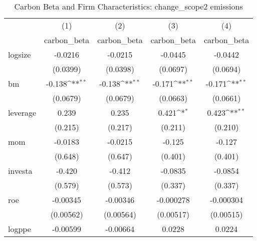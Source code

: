 \begin{table}[htbp]\centering
\def\sym#1{\ifmmode^{#1}\else\(^{#1}\)\fi}
\caption{Carbon Beta and Firm Characteristics: change\_scope2 emissions}
\begin{tabular}{l*{4}{c}}
\hline\hline
                    &\multicolumn{1}{c}{(1)}&\multicolumn{1}{c}{(2)}&\multicolumn{1}{c}{(3)}&\multicolumn{1}{c}{(4)}\\
                    &\multicolumn{1}{c}{carbon\_beta}&\multicolumn{1}{c}{carbon\_beta}&\multicolumn{1}{c}{carbon\_beta}&\multicolumn{1}{c}{carbon\_beta}\\
\hline
logsize             &     -0.0216         &     -0.0215         &     -0.0445         &     -0.0442         \\
                    &    (0.0399)         &    (0.0398)         &    (0.0697)         &    (0.0694)         \\
[1em]
bm                  &      -0.138\sym{**} &      -0.138\sym{**} &      -0.171\sym{**} &      -0.171\sym{**} \\
                    &    (0.0679)         &    (0.0679)         &    (0.0663)         &    (0.0661)         \\
[1em]
leverage            &       0.239         &       0.235         &       0.421\sym{*}  &       0.423\sym{**} \\
                    &     (0.215)         &     (0.217)         &     (0.211)         &     (0.210)         \\
[1em]
mom                 &     -0.0183         &     -0.0215         &      -0.125         &      -0.127         \\
                    &     (0.648)         &     (0.647)         &     (0.401)         &     (0.401)         \\
[1em]
investa             &      -0.420         &      -0.412         &     -0.0835         &     -0.0854         \\
                    &     (0.579)         &     (0.573)         &     (0.337)         &     (0.337)         \\
[1em]
roe                 &    -0.00345         &    -0.00346         &   -0.000278         &   -0.000304         \\
                    &   (0.00562)         &   (0.00564)         &   (0.00517)         &   (0.00515)         \\
[1em]
logppe              &    -0.00599         &    -0.00664         &      0.0228         &      0.0224         \\

\end{tabular}
\end{table}
